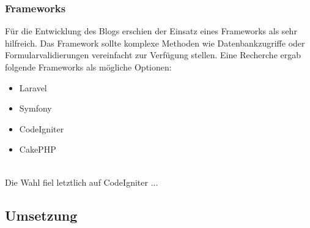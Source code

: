     \subsubsection{Frameworks}
    Für die Entwicklung des Blogs erschien der Einsatz eines Frameworks als sehr hilfreich. Das Framework sollte komplexe Methoden wie
    Datenbankzugriffe oder Formularvalidierungen vereinfacht zur Verfügung stellen. Eine Recherche ergab folgende Frameworks als mögliche
    Optionen:

    \begin{itemize}
      \item Laravel
      \item Symfony
      \item CodeIgniter
      \item CakePHP
    \end{itemize}
    \\
    Die Wahl fiel letztlich auf CodeIgniter ...

  \subsection{Umsetzung}


